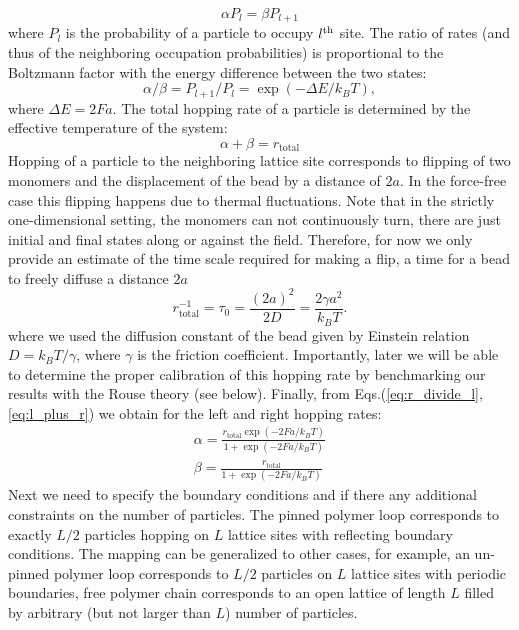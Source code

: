 \documentclass[aps,showpacs,twocolumn,floatfix,prx,superscriptaddress]{revtex4-1}
\begin{document}
\begin{equation}
    \alpha P_{l} = \beta P_{l+1} \label{eq:db}
\end{equation}
where $P_{l}$ is the probability of a particle to occupy $l^{\rm{th}}$ site. The ratio of rates (and thus of the neighboring occupation probabilities) is proportional to the Boltzmann factor with the energy difference between the two states:
\begin{equation}
    \alpha / \beta = P_{l+1} / P_{l} = \exp{(-\Delta E / k_B T)},  \label{eq:r_divide_l}
\end{equation}
where  $\Delta E = 2Fa$.  The total hopping rate of a particle is determined by the effective temperature of the system: 
\begin{equation}
    \alpha + \beta = r_{\text{total}} \label{eq:l_plus_r}
\end{equation}
Hopping of a particle to the neighboring lattice site corresponds to flipping of two monomers and the displacement of the bead by a distance of $2a$. In the force-free case this flipping happens due to thermal fluctuations. Note that in the strictly one-dimensional setting, the monomers can not continuously turn, there are just initial and final states along or against the field. Therefore, for now we only provide an estimate of the time scale required for making a flip, a time for a bead to freely diffuse a distance $2a$ 
\begin{equation}
    \label{eq:timeScale}
    r_{\text{total}}^{-1} = \tau_0 = \frac{(2a)^2}{2D} = \frac{2\gamma a^2}{k_{B}T}.
\end{equation}
where we used the diffusion constant of the bead given by Einstein relation $D=k_{B}T/\gamma$, where $\gamma$ is the friction coefficient. Importantly, later we will be able to determine the proper calibration of this hopping rate by benchmarking our results with the Rouse theory (see below). 
Finally, from Eqs.(\ref{eq:r_divide_l},\ref{eq:l_plus_r}) we obtain for the left and right hopping rates:
\begin{subequations}
    \label{eq:l_and_r}
    \begin{eqnarray}
        \alpha  =   \frac{r_{\text{total}}\exp{(-2Fa / k_B T)}}{1+\exp{(-2Fa / k_B T)}} \\
        \beta  =  \frac{r_{\text{total}}}{1+\exp{(-2Fa / k_B T)}}
    \end{eqnarray}
\end{subequations}
Next we need to specify the boundary conditions and if there any additional constraints on the number of particles. The pinned polymer loop corresponds to exactly $L/2$ particles hopping on $L$
lattice sites with reflecting boundary conditions. The mapping can be generalized to other cases, for example,
an un-pinned polymer loop corresponds to $L/2$ particles on $L$ lattice sites with
periodic boundaries, free polymer chain corresponds to an open lattice of length $L$ filled by
arbitrary (but not larger than $L$) number of particles. 
\end{document}

